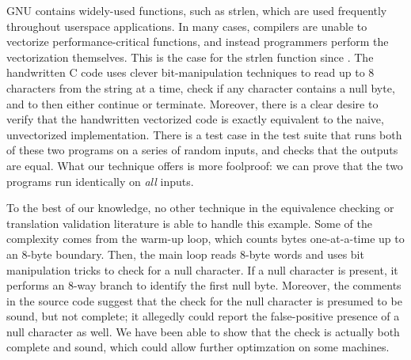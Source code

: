 GNU \libc{} contains widely-used functions, such as strlen, which are
used frequently throughout userspace applications. In many cases,
compilers are unable to vectorize performance-critical functions, and
instead programmers perform the vectorization themselves. This is the
case for the strlen function since \libc{} . The
handwritten C code uses clever bit-manipulation techniques to read
up to 8 characters from the string at a time, check if any character
contains a null byte, and to then either continue or terminate.
Moreover, there is a clear desire to verify that the handwritten
vectorized code is exactly equivalent to the naive, unvectorized
implementation. There is a test case in the \libc{} test suite that
runs both of these two programs on a series of random inputs, and
checks that the outputs are equal. What our technique offers is more
foolproof: we can prove that the two programs run identically on
\emph{all} inputs.

To the best of our knowledge, no other technique in the equivalence
checking or translation validation literature is able to handle this
example. Some of the complexity comes from the warm-up loop, which
counts bytes one-at-a-time up to an 8-byte boundary. Then, the main
loop reads 8-byte words and uses bit manipulation tricks to check
for a null character. If a null character is present, it performs an
8-way branch to identify the first null byte. Moreover, the comments
in the source code suggest that the check for the null character is
presumed to be sound, but not complete; it allegedly could report the
false-positive presence of a null character as well. We have been able
to show that the check is actually both complete and sound, which
could allow further optimzation on some machines.

